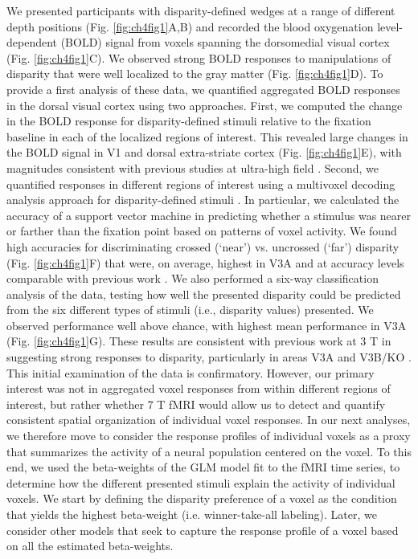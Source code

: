 We presented participants with disparity-defined wedges at a range of different depth positions (Fig. \ref{fig:ch4fig1}A,B) and recorded the blood oxygenation level-dependent (BOLD) signal from voxels spanning the dorsomedial visual cortex (Fig. \ref{fig:ch4fig1}C). We observed strong BOLD responses to manipulations of disparity that were well localized to the gray matter (Fig. \ref{fig:ch4fig1}D). To provide a first analysis of these data, we quantified aggregated BOLD responses in the dorsal visual cortex using two approaches. First, we computed the change in the BOLD response for disparity-defined stimuli relative to the fixation baseline in each of the localized regions of interest. This revealed large changes in the BOLD signal in V1 and dorsal extra-striate cortex (Fig. \ref{fig:ch4fig1}E), with magnitudes consistent with previous studies at ultra-high field \cite{Hoffmann:2009vn,Zwaag:2009ss,Polimeni:2010fl}. Second, we quantified responses in different regions of interest using a multivoxel decoding analysis approach for disparity-defined stimuli \cite{Preston:2008dg}. In particular, we calculated the accuracy of a support vector machine in predicting whether a stimulus was nearer or farther than the fixation point based on patterns of voxel activity. We found high accuracies for discriminating crossed (`near') vs. uncrossed (`far') disparity (Fig. \ref{fig:ch4fig1}F) that were, on average, highest in V3A and at accuracy levels comparable with previous work \cite{Preston:2008dg}. We also performed a six-way classification analysis of the data, testing how well the presented disparity could be predicted from the six different types of stimuli (i.e., disparity values) presented. We observed performance well above chance, with highest mean performance in V3A (Fig. \ref{fig:ch4fig1}G). These results are consistent with previous work at 3 T in suggesting strong responses to disparity, particularly in areas V3A and V3B/KO \cite{Backus:2001ly,Tsao:2003lk,Preston:2008dg}. 
This initial examination of the data is confirmatory. However, our primary interest was not in aggregated voxel responses from within different regions of interest, but rather whether 7 T fMRI would allow us to detect and quantify consistent spatial organization of individual voxel responses. In our next analyses, we therefore move to consider the response profiles of individual voxels as a proxy that summarizes the activity of a neural population centered on the voxel. To this end, we used the beta-weights of the GLM model fit to the fMRI time series, to determine how the different presented stimuli explain the activity of individual voxels. We start by defining the disparity preference of a voxel as the condition that yields the highest beta-weight (i.e. winner-take-all labeling). Later, we consider other models that seek to capture the response profile of a voxel based on all the estimated beta-weights.

